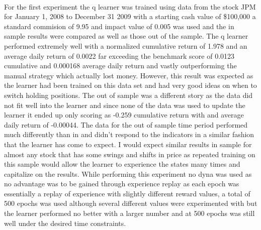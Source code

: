 \documentclass[12pt]{article}
\begin{document}
\text{ }\\
For the first experiment the q learner was trained using data from the stock JPM for January 1, 2008 to December 31 2009 with a starting cash value of \$100,000 a standard commision of 9.95 and impact value of 0.005 was used and the in sample results were compared as well as those out of the sample. The q learner performed extremely well with a normalized cumulative return of 1.978 and an average daily return of 0.0022 far exceeding the benchmark score of 0.0123 cumulative and 0.000168 average daily return and vastly outperforming the manual strategy which actually lost money. However, this result was expected as the learner had been trained on this data set and had very good ideas on when to switch holding positions. The out of sample was a different story as the data did not fit well into the learner and since none of the data was used to update the learner it ended up only scoring as -0.259 cumulative return with and average daily return of -0.00044. The data for the out of sample time period performed much differently than in and didn't respond to the indicators in a similar fashion that the learner has come to expect. I would expect similar results in sample for almost any stock that has some swings and shifts in price as repeated training on this sample would allow the learner to experience the states many times and capitalize on the results. While performing this experiment no dyna was used as no advantage was to be gained through experience replay as each epoch was essentially a replay of experience with slightly different reward values, a total of 500 epochs was used although several different values were experimented with but the learner performed no better with a larger number and at 500 epochs was still well under the desired time constraints. \\
\end{document}
